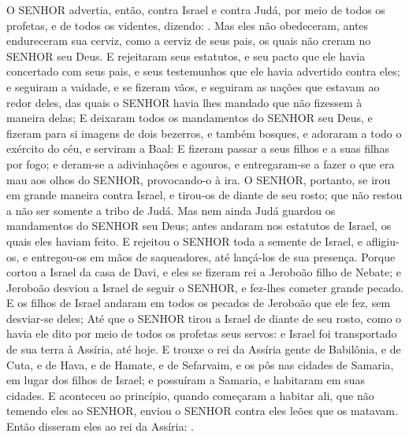 {  O SENHOR advertia, então, contra Israel e contra Judá, por meio de todos os profetas, e de todos os videntes, dizendo: .
  Mas eles não obedeceram, antes endureceram sua cerviz, como a cerviz de seus pais, os quais não creram no SENHOR seu Deus.
  E rejeitaram seus estatutos, e seu pacto que ele havia concertado com seus pais, e seus testemunhos que ele havia advertido contra eles; e seguiram a vaidade, e se fizeram vãos, e seguiram as nações que estavam ao redor deles, das quais o SENHOR havia lhes mandado que não fizessem à maneira delas;
  E deixaram todos os mandamentos do SENHOR seu Deus, e fizeram para si imagens de dois bezerros, e também bosques, e adoraram a todo o exército do céu, e serviram a Baal:
  E fizeram passar a seus filhos e a suas filhas por fogo; e deram-se a adivinhações e agouros, e entregaram-se a fazer o que era mau aos olhos do SENHOR, provocando-o à ira.
  O SENHOR, portanto, se irou em grande maneira contra Israel, e tirou-os de diante de seu rosto; que não restou a não ser somente a tribo de Judá.
  Mas nem ainda Judá guardou os mandamentos do SENHOR seu Deus; antes andaram nos estatutos de Israel, os quais eles haviam feito.
  E rejeitou o SENHOR toda a semente de Israel, e afligiu-os, e entregou-os em mãos de saqueadores, até lançá-los de sua presença.
  Porque cortou a Israel da casa de Davi, e eles se fizeram rei a Jeroboão filho de Nebate; e Jeroboão desviou a Israel de seguir o SENHOR, e fez-lhes cometer grande pecado.
  E os filhos de Israel andaram em todos os pecados de Jeroboão que ele fez, sem desviar-se deles;
  Até que o SENHOR tirou a Israel de diante de seu rosto, como o havia ele dito por meio de todos os profetas seus servos: e Israel foi transportado de sua terra à Assíria, até hoje.
  E trouxe o rei da Assíria gente de Babilônia, e de Cuta, e de Hava, e de Hamate, e de Sefarvaim, e os pôs nas cidades de Samaria, em lugar dos filhos de Israel; e possuíram a Samaria, e habitaram em suas cidades.
  E aconteceu ao princípio, quando começaram a habitar ali, que não temendo eles ao SENHOR, enviou o SENHOR contra eles leões que os matavam.
  Então disseram eles ao rei da Assíria: .
}
